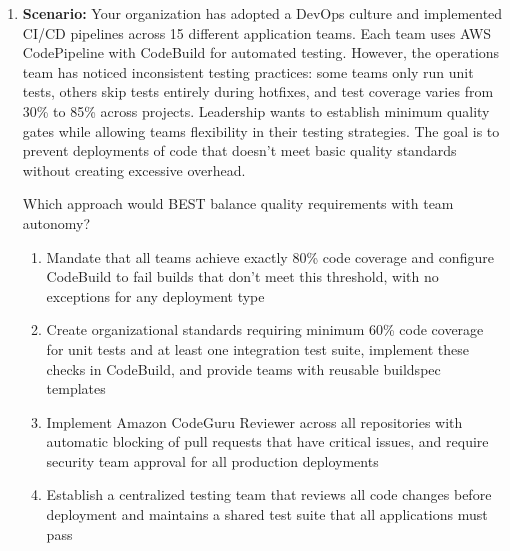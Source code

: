 \documentclass[12pt,a4paper]{article}
\begin{document}
\begin{enumerate}[label=\textbf{Q\arabic*.}]
What is the MOST efficient approach to meet these requirements?

\begin{enumerate}[label=\Alph*.]
    \item Configure AWS CodePipeline to trigger AWS Lambda functions that perform custom security scans using third-party tools, then store results in Amazon S3 for manual review
    \item Implement Amazon CodeGuru Security to automatically scan code on every commit, integrate findings into pull requests, and configure CodePipeline to fail builds when critical vulnerabilities are detected
    \item Set up AWS CodeBuild to run OWASP dependency checks and static analysis tools, then require manual approval from the security team before proceeding to deployment stages
    \item Use AWS Security Hub to aggregate security findings from multiple sources and create Amazon EventBridge rules to notify developers via Amazon SNS when issues are detected
\end{enumerate}

\textit{Answer: B}

\item \textbf{Scenario:} Your organization has adopted a DevOps culture and implemented CI/CD pipelines across 15 different application teams. Each team uses AWS CodePipeline with CodeBuild for automated testing. However, the operations team has noticed inconsistent testing practices: some teams only run unit tests, others skip tests entirely during hotfixes, and test coverage varies from 30\% to 85\% across projects. Leadership wants to establish minimum quality gates while allowing teams flexibility in their testing strategies. The goal is to prevent deployments of code that doesn't meet basic quality standards without creating excessive overhead.

Which approach would BEST balance quality requirements with team autonomy?

\begin{enumerate}[label=\Alph*.]
    \item Mandate that all teams achieve exactly 80\% code coverage and configure CodeBuild to fail builds that don't meet this threshold, with no exceptions for any deployment type
    \item Create organizational standards requiring minimum 60\% code coverage for unit tests and at least one integration test suite, implement these checks in CodeBuild, and provide teams with reusable buildspec templates
    \item Implement Amazon CodeGuru Reviewer across all repositories with automatic blocking of pull requests that have critical issues, and require security team approval for all production deployments
    \item Establish a centralized testing team that reviews all code changes before deployment and maintains a shared test suite that all applications must pass
\end{enumerate}


\end{enumerate}
\end{document}
